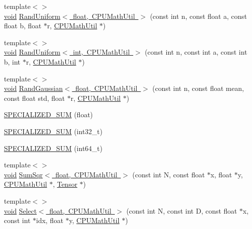\begin{DoxyCompactItemize}
\item 
{\footnotesize template$<$$>$ }\\\mbox{\hyperlink{mlasi_8h_a88f941d423cb2a819b70a1358982b1a6}{void}} \mbox{\hyperlink{namespaceonnxruntime_1_1math_a4b2f943a58a834387d4de84b8c2e5714}{Rand\+Uniform$<$ float, C\+P\+U\+Math\+Util $>$}} (const int n, const float a, const float b, float $\ast$r, \mbox{\hyperlink{classonnxruntime_1_1CPUMathUtil}{C\+P\+U\+Math\+Util}} $\ast$)
\item 
{\footnotesize template$<$$>$ }\\\mbox{\hyperlink{mlasi_8h_a88f941d423cb2a819b70a1358982b1a6}{void}} \mbox{\hyperlink{namespaceonnxruntime_1_1math_ac5ce151c45379ea7490c0d9700d88749}{Rand\+Uniform$<$ int, C\+P\+U\+Math\+Util $>$}} (const int n, const int a, const int b, int $\ast$r, \mbox{\hyperlink{classonnxruntime_1_1CPUMathUtil}{C\+P\+U\+Math\+Util}} $\ast$)
\item 
{\footnotesize template$<$$>$ }\\\mbox{\hyperlink{mlasi_8h_a88f941d423cb2a819b70a1358982b1a6}{void}} \mbox{\hyperlink{namespaceonnxruntime_1_1math_a942e9cce900cd43050f760c163af67c4}{Rand\+Gaussian$<$ float, C\+P\+U\+Math\+Util $>$}} (const int n, const float mean, const float std, float $\ast$r, \mbox{\hyperlink{classonnxruntime_1_1CPUMathUtil}{C\+P\+U\+Math\+Util}} $\ast$)
\item 
\mbox{\hyperlink{namespaceonnxruntime_1_1math_a73846fad0829fa2b07974a135abe6f2d}{S\+P\+E\+C\+I\+A\+L\+I\+Z\+E\+D\+\_\+\+S\+UM}} (float)
\item 
\mbox{\hyperlink{namespaceonnxruntime_1_1math_aa6926607de0ad578945815dec77b51ca}{S\+P\+E\+C\+I\+A\+L\+I\+Z\+E\+D\+\_\+\+S\+UM}} (int32\+\_\+t)
\item 
\mbox{\hyperlink{namespaceonnxruntime_1_1math_a30e0fe3ea70473a15869776e474e0271}{S\+P\+E\+C\+I\+A\+L\+I\+Z\+E\+D\+\_\+\+S\+UM}} (int64\+\_\+t)
\item 
{\footnotesize template$<$$>$ }\\\mbox{\hyperlink{mlasi_8h_a88f941d423cb2a819b70a1358982b1a6}{void}} \mbox{\hyperlink{namespaceonnxruntime_1_1math_a95efa2c6981147ba9a08c2e6db872c94}{Sum\+Sqr$<$ float, C\+P\+U\+Math\+Util $>$}} (const int N, const float $\ast$x, float $\ast$y, \mbox{\hyperlink{classonnxruntime_1_1CPUMathUtil}{C\+P\+U\+Math\+Util}} $\ast$, \mbox{\hyperlink{classonnxruntime_1_1Tensor}{Tensor}} $\ast$)
\item 
{\footnotesize template$<$$>$ }\\\mbox{\hyperlink{mlasi_8h_a88f941d423cb2a819b70a1358982b1a6}{void}} \mbox{\hyperlink{namespaceonnxruntime_1_1math_a5af96dd791e9b526301eb469b35374d8}{Select$<$ float, C\+P\+U\+Math\+Util $>$}} (const int N, const int D, const float $\ast$x, const int $\ast$idx, float $\ast$y, \mbox{\hyperlink{classonnxruntime_1_1CPUMathUtil}{C\+P\+U\+Math\+Util}} $\ast$)

\end{DoxyCompactItemize}
